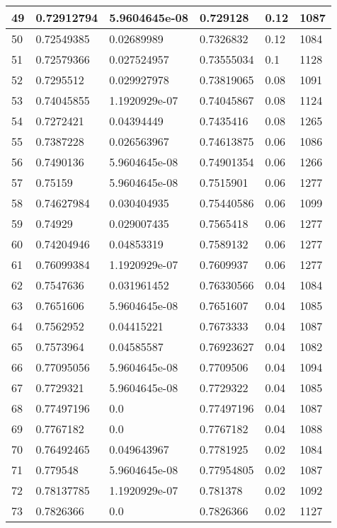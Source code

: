 \begin{longtable}{|l|l|l|l|l|l|}
49 & 0.72912794 & 5.9604645e-08 & 0.729128 & 0.12 & 1087 \\ \hline 
50 & 0.72549385 & 0.02689989 & 0.7326832 & 0.12 & 1084 \\ \hline 
51 & 0.72579366 & 0.027524957 & 0.73555034 & 0.1 & 1128 \\ \hline 
52 & 0.7295512 & 0.029927978 & 0.73819065 & 0.08 & 1091 \\ \hline 
53 & 0.74045855 & 1.1920929e-07 & 0.74045867 & 0.08 & 1124 \\ \hline 
54 & 0.7272421 & 0.04394449 & 0.7435416 & 0.08 & 1265 \\ \hline 
55 & 0.7387228 & 0.026563967 & 0.74613875 & 0.06 & 1086 \\ \hline 
56 & 0.7490136 & 5.9604645e-08 & 0.74901354 & 0.06 & 1266 \\ \hline 
57 & 0.75159 & 5.9604645e-08 & 0.7515901 & 0.06 & 1277 \\ \hline 
58 & 0.74627984 & 0.030404935 & 0.75440586 & 0.06 & 1099 \\ \hline 
59 & 0.74929 & 0.029007435 & 0.7565418 & 0.06 & 1277 \\ \hline 
60 & 0.74204946 & 0.04853319 & 0.7589132 & 0.06 & 1277 \\ \hline 
61 & 0.76099384 & 1.1920929e-07 & 0.7609937 & 0.06 & 1277 \\ \hline 
62 & 0.7547636 & 0.031961452 & 0.76330566 & 0.04 & 1084 \\ \hline 
63 & 0.7651606 & 5.9604645e-08 & 0.7651607 & 0.04 & 1085 \\ \hline 
64 & 0.7562952 & 0.04415221 & 0.7673333 & 0.04 & 1087 \\ \hline 
65 & 0.7573964 & 0.04585587 & 0.76923627 & 0.04 & 1082 \\ \hline 
66 & 0.77095056 & 5.9604645e-08 & 0.7709506 & 0.04 & 1094 \\ \hline 
67 & 0.7729321 & 5.9604645e-08 & 0.7729322 & 0.04 & 1085 \\ \hline 
68 & 0.77497196 & 0.0 & 0.77497196 & 0.04 & 1087 \\ \hline 
69 & 0.7767182 & 0.0 & 0.7767182 & 0.04 & 1088 \\ \hline 
70 & 0.76492465 & 0.049643967 & 0.7781925 & 0.02 & 1084 \\ \hline 
71 & 0.779548 & 5.9604645e-08 & 0.77954805 & 0.02 & 1087 \\ \hline 
72 & 0.78137785 & 1.1920929e-07 & 0.781378 & 0.02 & 1092 \\ \hline 
73 & 0.7826366 & 0.0 & 0.7826366 & 0.02 & 1127 \\ \hline 

\end{longtable}
